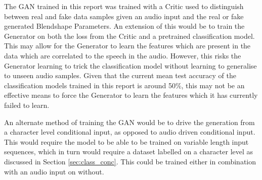 The GAN trained in this report was trained with a Critic used to distinguish between real and fake data samples given an audio input and the real or fake generated Blendshape Parameters.
An extension of this would be to train the Generator on both the loss from the Critic and a pretrained classification model.
This may allow for the Generator to learn the features which are present in the data which are correlated to the speech in the audio.
However, this risks the Generator learning to trick the classification model without learning to generalise to unseen audio samples.
Given that the current mean test accuracy of the classification models trained in this report is around 50\%, this may not be an effective means to force the Generator to learn the features which it has currently failed to learn.

An alternate method of training the GAN would be to drive the generation from a character level conditional input, as opposed to audio driven conditional input.
This would require the model to be able to be trained on variable length input sequences, which in turn would require a dataset labelled on a character level as discussed in Section \ref{sec:class_conc}.
This could be trained either in combination with an audio input on without.

